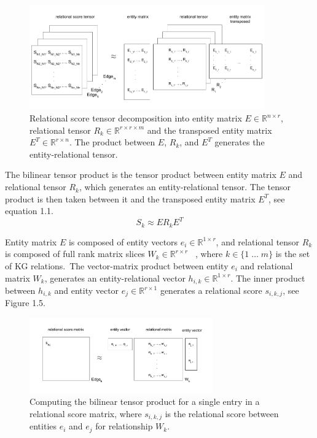 \begin{figure}[H]
   	\centering
    	\includegraphics[width=0.9\textwidth, height=0.4\textwidth]{relational_tensor_entity_relational_factorisation}
	\captionsetup{justification=centering}
	\caption{Relational score tensor decomposition into entity matrix $ E  \in \mathbb{R}^{n \times r} $, relational tensor $ R_k \in \mathbb{R}^{r \times r \times m} $ and the transposed entity matrix $ E^T \in \mathbb{R}^{r \times n} $. The product between $ E $, $ R_k $, and $ E^T $ generates the entity-relational tensor.}
\end{figure}

\noindent The bilinear tensor product is the tensor product between entity matrix $ E $ and relational tensor $ R_k $, which generates an entity-relational tensor. The tensor product is then taken between it and the transposed entity matrix $ E^T $, see equation 1.1.
\begin{equation}
	S_k \approx ER_kE^T
\end{equation}

\noindent Entity matrix $ E $ is composed of entity vectors $ e_i \in \mathbb{R}^{1 \times r} $, and relational tensor $ R_k $ is composed of full rank matrix slices $ W_k \in \mathbb{R}^{r \times r} $ \unskip~\citep{nickel2012factorizing}, where $ k \in \{1 \; \dots \; m \} $ is the set of KG relations.\ The vector-matrix product between entity $ e_i $ and relational matrix $ W_k $, generates an entity-relational vector $ h_{i,k} \in \mathbb{R}^{1 \times r} $. The inner product between $ h_{i,k} $ and entity vector $ e_j \in \mathbb{R}^{r \times 1} $ generates a relational score $ s_{i,k,j} $, see Figure 1.5. 

\begin{figure}[H]
   	\centering
    	\includegraphics[width=0.7\textwidth, height=0.3\textwidth]{bilinear_tensor_product}
	\captionsetup{justification=centering}
	\caption{Computing the bilinear tensor product for a single entry in a relational score matrix, where $ s_{i,k,j} $ is the relational score between entities $ e_i $ and $ e_j$ for relationship $ W_k $. }
\end{figure}

